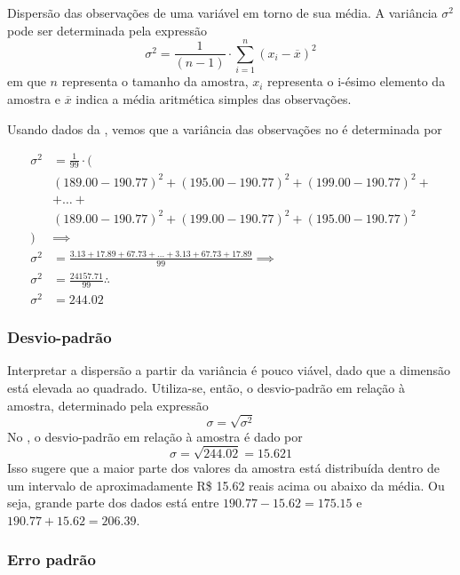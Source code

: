 Dispersão das observações de uma variável em torno de sua média. A variância
$\sigma^2$ pode ser determinada pela expressão
\begin{equation}
    \sigma^2 = \frac{1}{(n-1)} \cdot \sum_{i=1}^{n} (x_i - \overline{x})^2
    \label{eq:variancia}
\end{equation}
em que $n$ representa o tamanho da amostra, $x_i$ representa o i-ésimo elemento
da amostra e $\overline{x}$ indica a média aritmética simples das observações.

Usando dados da , vemos que a variância das
observações no  é determinada por

\begin{align*}
    \sigma^2 &= \frac{1}{99} \cdot \Big( \\
    &(189.00-190.77)^2 + (195.00-190.77)^2 + (199.00-190.77)^2 + \\
    &+ \ldots + \\
    &(189.00-190.77)^2 + (199.00-190.77)^2 + (195.00-190.77)^2 \\
    \Big) &\implies \\
    \sigma^2 &= \frac{3.13 + 17.89 + 67.73 + \ldots + 3.13 + 67.73 + 17.89}{99} \implies \\
    \sigma^2 &= \frac{24157.71}{99} \therefore \\
    \sigma^2 &= 244.02
\end{align*}

\subsubsection{Desvio-padrão}

Interpretar a dispersão a partir da variância é pouco viável, dado que a
dimensão está elevada ao quadrado. Utiliza-se, então, o desvio-padrão em
relação à amostra, determinado pela expressão
\begin{equation}
    \sigma = \sqrt{\sigma^2}
    \label{eq:desvio-padrao}
\end{equation}
No , o desvio-padrão em relação à amostra é dado por
\[
\sigma=\sqrt{244.02}=15.621
\]
Isso sugere que a maior parte dos valores da amostra está distribuída dentro de
um intervalo de aproximadamente R\$ 15.62 reais acima ou abaixo da média. Ou
seja, grande parte dos dados está entre $190.77-15.62=175.15$ e
$190.77+15.62=206.39$.

\subsubsection{Erro padrão}

